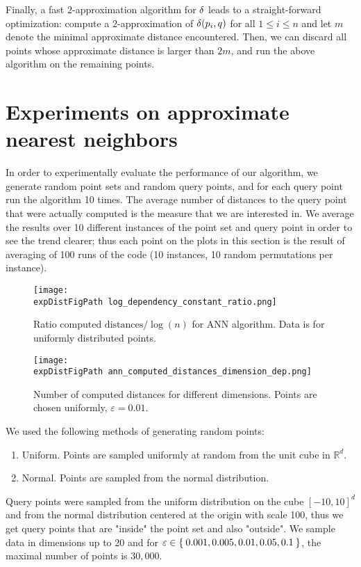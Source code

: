 \documentclass{ws-ijcga}
\renewcommand{\leq}{\leqslant}
\newcommand{\eps}{\varepsilon}
\newcommand{\RR}{\mathbb{R}}
\def \expDistFigPath {pics/}
\begin{document}
Finally, a fast $2$-approximation algorithm for $\delta$ leads to a straight-forward
optimization: compute a $2$-approximation of $\delta(p_i,q)$ for all $1\leq i\leq n$
and let $m$ denote the minimal approximate distance encountered. Then, we can discard all points
whose approximate distance is larger than $2m$, and run the above algorithm on the remaining points.



\section{Experiments on approximate nearest neighbors}
\label{sec:experiment_ann}

In order to experimentally evaluate the performance of our algorithm,
we generate random point sets and random query points, and for each query point
run the algorithm 10 times. The average number of distances to the query point
that were actually computed is the measure that we are interested in.
We average the results over 10 different instances of the point
set and query point in order to see the trend clearer; thus
each point on the plots in this section is the result of averaging of 100 runs
of the code (10 instances, 10 random permutations per instance).

\begin{figure}[ht]
    \begin{minipage}{0.45\textwidth}
        \texttt{[image: \\expDistFigPath log\_dependency\_constant\_ratio.png]}
        \caption{Ratio $\mbox{computed distances} / \log(n)$ for ANN algorithm. Data is for uniformly distributed
        points.}
        \label{fig:ann_const_ratio}
    \end{minipage}
    \begin{minipage}{0.45\textwidth}
        \texttt{[image: \\expDistFigPath ann\_computed\_distances\_dimension\_dep.png]}
        \caption{Number of computed distances for different dimensions. Points are chosen uniformly, $\eps = 0.01$.}
        \label{fig:ann_dimension_dependence}
    \end{minipage}
\end{figure}


We used the following methods of generating random points:
\begin{enumerate}
    \item Uniform. Points are sampled uniformly at random from the unit cube in $\RR^d$.
    \item Normal. Points are sampled from the normal distribution.
\end{enumerate}
Query points were sampled from the uniform distribution on the cube $[-10, 10]^d$
and from the normal distribution centered at the origin with scale 100,
thus we get query points that are "inside" the point set and also "outside".
We sample data in dimensions up to 20 and for $\eps \in \Set{0.001, 0.005, 0.01, 0.05, 0.1}$,
the maximal number of points is $30,000$.
\end{document}
